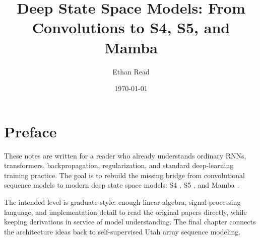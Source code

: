 \documentclass[11pt,letterpaper]{report}
\title{Deep State Space Models: From Convolutions to S4, S5, and Mamba}
\author{Ethan Read}
\date{\today}
\begin{document}
\maketitle

\tableofcontents

\chapter*{Preface}

These notes are written for a reader who already understands ordinary RNNs, transformers,
backpropagation, regularization, and standard deep-learning training practice. The goal is
to rebuild the missing bridge from convolutional sequence models to modern deep state space
models: S4 \citep{gu2022s4}, S5 \citep{smith2023s5}, and Mamba \citep{gu2023mamba}.

The intended level is graduate-style: enough linear algebra, signal-processing language,
and implementation detail to read the original papers directly, while keeping derivations
in service of model understanding. The final chapter connects the architecture ideas back
to self-supervised Utah array sequence modeling.












\end{document}
